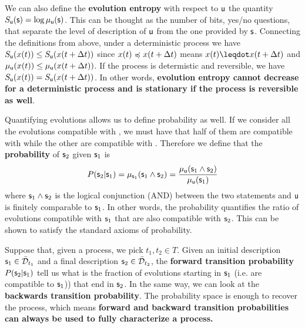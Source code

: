 \documentclass[letterpaper]{article}
\begin{document}
We can also define the \textbf{evolution entropy} with respect to $\stmt[u]$ the quantity $S_{\stmt[u]}(\stmt) = \log \mu_{\stmt[u]}(\stmt)$. This can be thought as the number of bits, yes/no questions, that separate the level of description of $\stmt[u]$ from the one provided by $\stmt$. Connecting the definitions from above, under a deterministic process we have $S_{\stmt[u]}(x(t)) \leq S_{\stmt[u]}(x(t + \Delta t))$ since $x(t)\narrower x(t+\Delta t)$ means $x(t) \finer x(t+\Delta t)$ and $\mu_{\stmt[u]}(x(t)) \leq \mu_{\stmt[u]}(x(t+\Delta t))$. If the process is determistic and reversible, we have $S_{\stmt[u]}(x(t)) = S_{\stmt[u]}(x(t + \Delta t))$. In other words, \textbf{evolution entropy cannot decrease for a deterministic process and is stationary if the process is reversible as well}.

Quantifying evolutions allows us to define probability as well. If we consider all the evolutions compatible with , we must have that half of them are compatible with  while the other are compatible with .  Therefore we define that the \textbf{probability} of $\stmt_2$ given $\stmt_1$ is
\begin{equation}
	P(\stmt_2 | \stmt_1) = \mu_{\stmt_1}(\stmt_1 \AND \stmt_2) = \frac{\mu_{\stmt[u]}(\stmt_1 \AND \stmt_2)}{\mu_{\stmt[u]}(\stmt_1)}
\end{equation} where $\stmt_1 \AND \stmt_2$ is the logical conjunction (AND) between the two statements and $\stmt[u]$ is finitely comparable to $\stmt_1$. In other words, the probability quantifies the ratio of evolutions compatible with $\stmt_1$ that are also compatible with $\stmt_2$. This can be shown to satisfy the standard axioms of probability.

Suppose that, given a process, we pick $t_1, t_2 \in T$. Given an initial description $\stmt_1 \in \tdomain_{t_1}$ and a final description $\stmt_2 \in \tdomain_{t_2}$, the \textbf{forward transition probability} $P(\stmt_2 | \stmt_1)$ tell us what is the fraction of evolutions starting in $\stmt_1$ (i.e. are compatible to $\stmt_1$)) that end in $\stmt_2$. In the same way, we can look at the \textbf{backwards transition probability}. The probability space is enough to recover the process, which means \textbf{forward and backward transition probabilities can always be used to fully characterize a process.}
\end{document}
